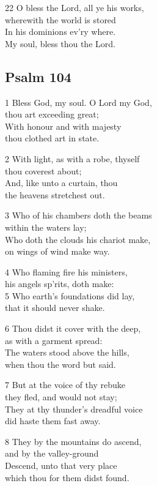 22 O bless the Lord, all ye his works,\\
wherewith the world is stored\\
In his dominions ev’ry where.\\
My soul, bless thou the Lord.

\begin{center}
\quad{}\quad{}
\end{center}

\subsection*{Psalm 104}

1 Bless God, my soul. O Lord my God,\\
thou art exceeding great;\\
With honour and with majesty\\
thou clothed art in state.

2 With light, as with a robe, thyself\\
thou coverest about;\\
And, like unto a curtain, thou\\
the heavens stretchest out.

3 Who of his chambers doth the beams\\
within the waters lay;\\
Who doth the clouds his chariot make,\\
on wings of wind make way.

4 Who flaming fire his ministers,\\
his angels sp’rits, doth make:\\
5 Who earth’s foundations did lay,\\
that it should never shake.

6 Thou didst it cover with the deep,\\
as with a garment spread:\\
The waters stood above the hills,\\
when thou the word but said.

7 But at the voice of thy rebuke\\
they fled, and would not stay;\\
They at thy thunder’s dreadful voice\\
did haste them fast away.

8 They by the mountains do ascend,\\
and by the valley-ground\\
Descend, unto that very place\\
which thou for them didst found.

